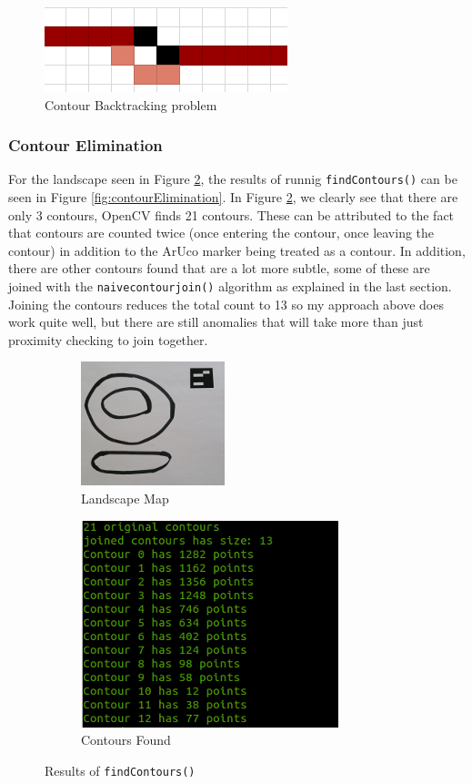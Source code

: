 \documentclass[11pt]{article}
\begin{document}
\begin{figure}[H]
	\centering
	\includegraphics[scale=0.8]{pics/backtrack.png}
	\caption{Contour Backtracking problem}
	\label{backtrack}
\end{figure}

\subsubsection{Contour Elimination}
For the landscape seen in Figure \ref{eliminationInput}, the results of
runnig \texttt{findContours()} can be seen in 
Figure \ref{fig:contourElimination}. In Figure \ref{eliminationInput}, we
clearly see that there are only 3 contours, OpenCV finds 21 contours. These
can be attributed to the fact that contours are counted twice (once entering
the contour, once leaving the contour) in addition to the ArUco marker being
treated as a contour. In addition, there are other contours found that are
a lot more subtle, some of these are joined with the \texttt{naivecontourjoin()}
algorithm as explained in the last section. Joining the contours
reduces the total count to 13 so my approach above does work quite well, but
there are still anomalies that will take more than just proximity checking
to join together. 

\begin{figure}[H]
	\centering
	\begin{subfigure}[t]{0.45\textwidth}
		\centering
		\includegraphics[scale=1.4]{pics/elimination.jpg}
		\caption{Landscape Map}
		\label{eliminationInput}
	\end{subfigure}
	\hfill
	\begin{subfigure}[t]{0.45\textwidth}
		\centering
		\includegraphics[scale=0.8]{pics/eliminationResults.png}
		\caption{Contours Found}
		\label{eliminationResults}
	\end{subfigure}
	\caption{Results of \texttt{findContours()}}
	\label{elimination}
\end{figure}
\end{document}
